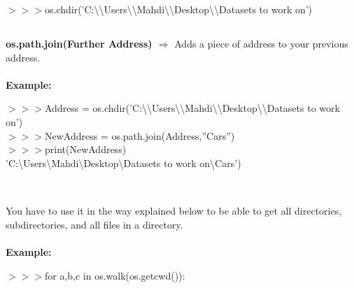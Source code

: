 \documentclass[a4paper,18pt]{article}
\begin{document}
$>>>$os.chdir('C:\textbackslash\textbackslash Users\textbackslash\textbackslash Mahdi\textbackslash\textbackslash Desktop\textbackslash\textbackslash Datasets to work on')\\


\subsection{\colorbox {matgreen}{\color{white}{\large os.path.join(Further Address)}}}
\textbf{os.path.join(Further Address) $\Rightarrow$} Adds a piece of address to your previous address.\\\\
\textbf{Example:\\}

$>>>$Address = os.chdir('C:\textbackslash\textbackslash Users\textbackslash\textbackslash Mahdi\textbackslash\textbackslash Desktop\textbackslash\textbackslash Datasets to work on')\\

$>>>$NewAddress = os.path.join(Address,''Cars'')\\

$>>>$print(NewAddress)\\

\hspace{14pt} 'C:\textbackslash Users\textbackslash Mahdi\textbackslash Desktop\textbackslash Datasets to work on\textbackslash Cars')\\\\


\subsection{\colorbox {matgreen}{\color{white}{\large os.walk}}}
You have to use it in the way explained below to be able to get all directories, subdirectories, and all files in a directory.\\\\
\textbf{Example:\\}



$>>>$for a,b,c in os.walk(os.getcwd()):\\
\end{document}
